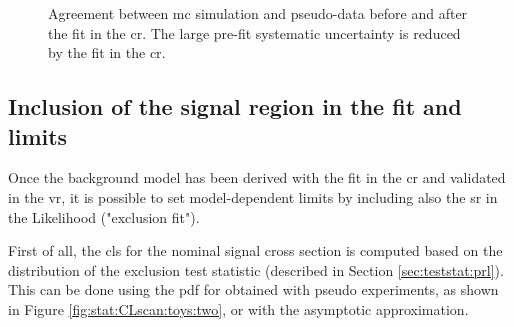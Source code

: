 \begin{itemize}
\begin{figure}[h]
\centering 
{}
\caption{
Agreement between \gls{mc} simulation and pseudo-data  before and  after the fit in the \gls{cr}. The large pre-fit systematic uncertainty is reduced by the fit in the \gls{cr}.
}
\label{fig:stat:VRunc}
\end{figure}

\end{itemize}


\subsection{Inclusion of the signal region in the fit and limits}
\label{sec:stat:example:limits}

Once the background model has been derived with the fit in the \gls{cr} and validated in the \gls{vr}, 
it is possible to set model-dependent limits by including also the \gls{sr} in the Likelihood ("exclusion fit").

First of all, the \gls{cls} for the nominal signal cross section is computed based on the distribution of the exclusion test statistic \qmu 
(described in Section \ref{sec:teststat:prl}). This can be done using the \gls{pdf} for \qmu obtained with pseudo experiments, as shown in 
Figure \ref{fig:stat:CLscan:toys:two}, or with the asymptotic approximation.


